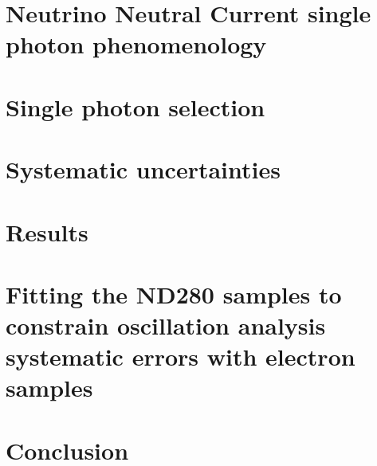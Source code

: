 \documentclass[a4paper,11pt,twoside]{report}
\begin{document}
\chapter{Neutrino Neutral Current single photon phenomenology}
\label{chap:pheno}

\clearpage

\chapter{Single photon selection}
\label{chap:select}

\clearpage

\chapter{Systematic uncertainties}
\label{chap:syst}

\clearpage

\chapter{Results}
\label{chap:result}

\clearpage
\newpage
\blankpage

\chapter{Fitting the ND280 samples to constrain oscillation analysis
  systematic errors with electron samples}
\label{chap:banff}

\clearpage

\chapter*{Conclusion}

\clearpage
\newpage
\blankpage

\appendix

\clearpage
\newpage
\blankpage

%
{}
\newpage
\blankpage
\blankpage
\end{document}
